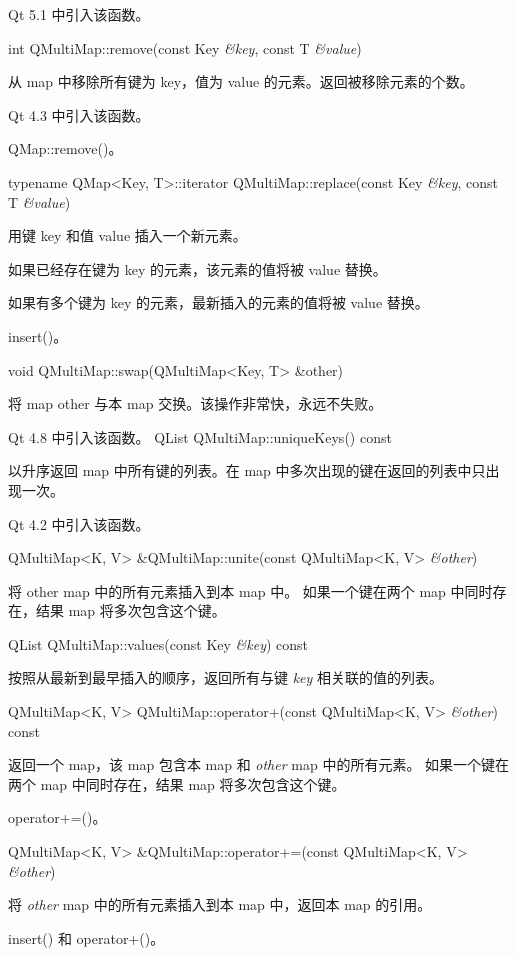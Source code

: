 Qt 5.1 中引入该函数。

int QMultiMap::remove(const Key \emph{\&key}, const T \emph{\&value})

从 map 中移除所有键为 key，值为 value 的元素。返回被移除元素的个数。

Qt 4.3 中引入该函数。

\begin{seeAlso}
QMap::remove()。
\end{seeAlso}

typename QMap<Key, T>::iterator QMultiMap::replace(const Key \emph{\&key}, const T \emph{\&value})

用键 key 和值 value 插入一个新元素。

如果已经存在键为 key 的元素，该元素的值将被 value 替换。

如果有多个键为 key 的元素，最新插入的元素的值将被 value 替换。

\begin{seeAlso}
insert()。
\end{seeAlso}

void QMultiMap::swap(QMultiMap<Key, T> \&other)

将 map other 与本 map 交换。该操作非常快，永远不失败。

Qt 4.8 中引入该函数。
QList QMultiMap::uniqueKeys() const

以升序返回 map 中所有键的列表。在 map 中多次出现的键在返回的列表中只出现一次。

Qt 4.2 中引入该函数。

QMultiMap<K, V> \&QMultiMap::unite(const QMultiMap<K, V> \emph{\&other})

将 other map 中的所有元素插入到本 map 中。
如果一个键在两个 map 中同时存在，结果 map 将多次包含这个键。

\lineHigh

QList QMultiMap::values(const Key \emph{\&key}) const

按照从最新到最早插入的顺序，返回所有与键 \emph{key} 相关联的值的列表。

\lineHigh

QMultiMap<K, V> QMultiMap::operator+(const QMultiMap<K, V> \emph{\&other}) const

返回一个 map，该 map 包含本 map 和 \emph{other} map 中的所有元素。
如果一个键在两个 map 中同时存在，结果 map 将多次包含这个键。

\begin{seeAlso}
operator+=()。
\end{seeAlso}

\lineHigh

QMultiMap<K, V> \&QMultiMap::operator+=(const QMultiMap<K, V> \emph{\&other})

将 \emph{other} map 中的所有元素插入到本 map 中，返回本 map 的引用。

\begin{seeAlso}
insert() 和 operator+()。
\end{seeAlso}